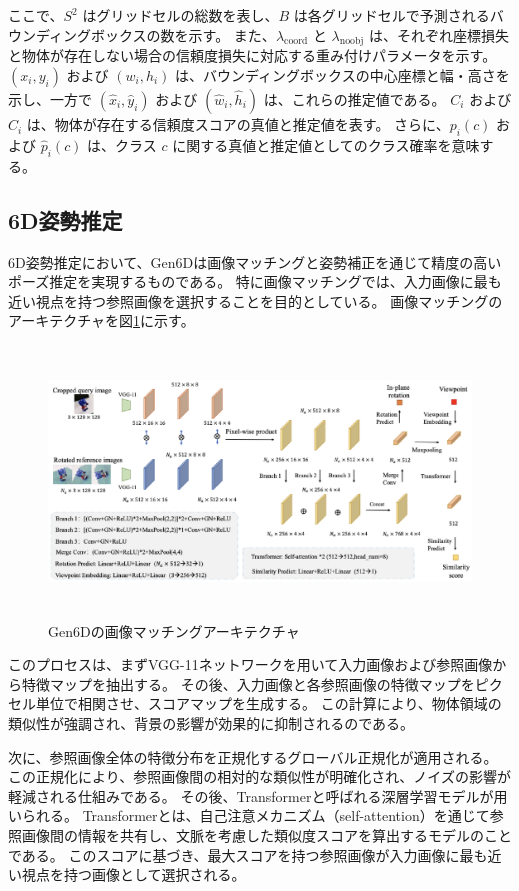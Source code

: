 ここで、$S^2$ はグリッドセルの総数を表し、$B$ は各グリッドセルで予測されるバウンディングボックスの数を示す。
また、$\lambda_{\text{coord}}$ と $\lambda_{\text{noobj}}$ は、それぞれ座標損失と物体が存在しない場合の信頼度損失に対応する重み付けパラメータを示す。
$(x_i, y_i)$ および $(w_i, h_i)$ は、バウンディングボックスの中心座標と幅・高さを示し、一方で $(\hat{x}_i, \hat{y}_i)$ および $(\hat{w}_i, \hat{h}_i)$ は、これらの推定値である。
$C_i$ および $\hat{C}_i$ は、物体が存在する信頼度スコアの真値と推定値を表す。
さらに、$p_i(c)$ および $\hat{p}_i(c)$ は、クラス $c$ に関する真値と推定値としてのクラス確率を意味する。


\subsection{6D姿勢推定}
6D姿勢推定において、Gen6Dは画像マッチングと姿勢補正を通じて精度の高いポーズ推定を実現するものである。
特に画像マッチングでは、入力画像に最も近い視点を持つ参照画像を選択することを目的としている。
画像マッチングのアーキテクチャを図\ref{fig:f5}に示す。
\begin{figure}[htbt]
	\centering
	 \includegraphics[height=72mm]{Figure/selector_arc.eps}
	 \caption{Gen6Dの画像マッチングアーキテクチャ}
	 \label{fig:f5}
\end{figure}

このプロセスは、まずVGG-11ネットワークを用いて入力画像および参照画像から特徴マップを抽出する。
その後、入力画像と各参照画像の特徴マップをピクセル単位で相関させ、スコアマップを生成する。
この計算により、物体領域の類似性が強調され、背景の影響が効果的に抑制されるのである。

次に、参照画像全体の特徴分布を正規化するグローバル正規化が適用される。
この正規化により、参照画像間の相対的な類似性が明確化され、ノイズの影響が軽減される仕組みである。
その後、Transformerと呼ばれる深層学習モデルが用いられる。
Transformerとは、自己注意メカニズム（self-attention）を通じて参照画像間の情報を共有し、文脈を考慮した類似度スコアを算出するモデルのことである。
このスコアに基づき、最大スコアを持つ参照画像が入力画像に最も近い視点を持つ画像として選択される。

